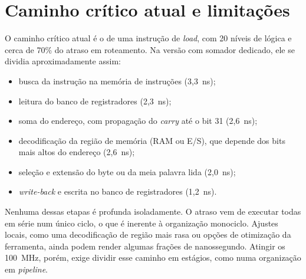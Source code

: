 \section{Caminho crítico atual e limitações}

O caminho crítico atual é o de uma instrução de \textit{load}, com 20 níveis
de lógica e cerca de 70\% do atraso em roteamento. Na versão com somador
dedicado, ele se dividia aproximadamente assim:
\begin{itemize}
  \item busca da instrução na memória de instruções (3,3~ns);
  \item leitura do banco de registradores (2,3~ns);
  \item soma do endereço, com propagação do \textit{carry} até o bit 31
    (2,6~ns);
  \item decodificação da região de memória (RAM ou E/S), que depende dos bits
    mais altos do endereço (2,6~ns);
  \item seleção e extensão do byte ou da meia palavra lida (2,0~ns);
  \item \textit{write-back} e escrita no banco de registradores (1,2~ns).
\end{itemize}

Nenhuma dessas etapas é profunda isoladamente. O atraso vem de executar
todas em série num único ciclo, o que é inerente à organização monociclo.
Ajustes locais, como uma decodificação de região mais rasa ou opções de
otimização da ferramenta, ainda podem render algumas frações de
nanossegundo. Atingir os 100~MHz, porém, exige dividir esse caminho em
estágios, como numa organização em \textit{pipeline}.
